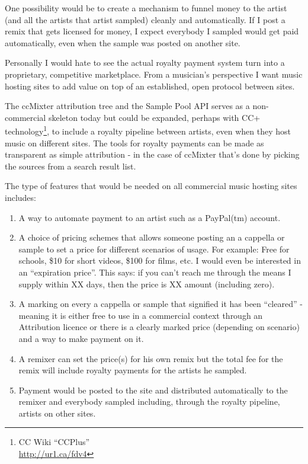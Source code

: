 One possibility would be to create a mechanism to funnel money to the artist
(and all the artists that artist sampled) cleanly and automatically. If I post a
remix that gets licensed for money, I expect everybody I sampled would get paid
automatically, even when the sample was posted on another site.

Personally I would hate to see the actual royalty payment system turn into a
proprietary, competitive marketplace. From a musician's perspective I want music
hosting sites to add value on top of an established, open protocol between
sites. 

The ccMixter attribution tree and the Sample Pool API serves as a non-commercial
skeleton today but could be expanded, perhaps with CC+ technology\footnote{CC
Wiki ``CCPlus''\\ 
\url{http://ur1.ca/fdv4}},
to include a royalty pipeline between artists, even when they host music on
dif\hbox{}ferent sites. The tools for royalty payments can be made as transparent as
simple attribution - in the case of ccMixter that's done by picking the sources
from a search result list.

The type of features that would be needed on all commercial music hosting sites
includes: 

\begin{enumerate}
    \item{A way to automate payment to an artist such as a PayPal(tm) account.}
    \item{A choice of pricing schemes that allows someone posting an a cappella
        or sample to set a price for dif\hbox{}ferent scenarios of usage. For example:
        Free for schools, \$10 for short videos, \$100 for f\hbox{}ilms, etc. I would
        even be interested in an ``expiration price''. This says: if you can't
        reach me through the means I supply within XX days, then the price is XX
        amount (including zero).}
    \item{A marking on every a cappella or sample that signif\hbox{}ied it has been
        ``cleared'' - meaning it is either free to use in a commercial context
        through an Attribution licence or there is a clearly marked price
        (depending on scenario) and a way to make payment on it.}
    \item{A remixer can set the price(s) for his own remix but the total fee for
        the remix will include royalty payments for the artists he sampled.}
    \item{Payment would be posted to the site and distributed automatically to
        the remixer and everybody sampled including, through the royalty
        pipeline, artists on other sites.}
\end{enumerate}

